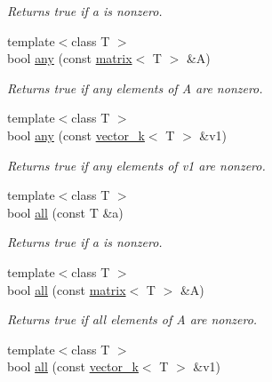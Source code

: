 \begin{DoxyCompactItemize}
\begin{DoxyCompactList}\small\item\em Returns true if a is nonzero. \end{DoxyCompactList}\item 
\hypertarget{namespacekeycpp_ade6d308fd22d34ad4860e5fcd22ccb39}{{\footnotesize template$<$class T $>$ }\\bool \hyperlink{namespacekeycpp_ade6d308fd22d34ad4860e5fcd22ccb39}{any} (const \hyperlink{classkeycpp_1_1matrix}{matrix}$<$ T $>$ \&A)}\label{namespacekeycpp_ade6d308fd22d34ad4860e5fcd22ccb39}

\begin{DoxyCompactList}\small\item\em Returns true if any elements of A are nonzero. \end{DoxyCompactList}\item 
\hypertarget{namespacekeycpp_af40fa7667b60f30a3b0912464d382d57}{{\footnotesize template$<$class T $>$ }\\bool \hyperlink{namespacekeycpp_af40fa7667b60f30a3b0912464d382d57}{any} (const \hyperlink{classkeycpp_1_1vector__k}{vector\-\_\-k}$<$ T $>$ \&v1)}\label{namespacekeycpp_af40fa7667b60f30a3b0912464d382d57}

\begin{DoxyCompactList}\small\item\em Returns true if any elements of v1 are nonzero. \end{DoxyCompactList}\item 
\hypertarget{namespacekeycpp_aab77d82d9cc7d1fcca87967048f09e0e}{{\footnotesize template$<$class T $>$ }\\bool \hyperlink{namespacekeycpp_aab77d82d9cc7d1fcca87967048f09e0e}{all} (const T \&a)}\label{namespacekeycpp_aab77d82d9cc7d1fcca87967048f09e0e}

\begin{DoxyCompactList}\small\item\em Returns true if a is nonzero. \end{DoxyCompactList}\item 
\hypertarget{namespacekeycpp_a0ebd51ca90981278382a922c04ee7a75}{{\footnotesize template$<$class T $>$ }\\bool \hyperlink{namespacekeycpp_a0ebd51ca90981278382a922c04ee7a75}{all} (const \hyperlink{classkeycpp_1_1matrix}{matrix}$<$ T $>$ \&A)}\label{namespacekeycpp_a0ebd51ca90981278382a922c04ee7a75}

\begin{DoxyCompactList}\small\item\em Returns true if all elements of A are nonzero. \end{DoxyCompactList}\item 
\hypertarget{namespacekeycpp_a9fe10fe179c6988a6f72e3715197457c}{{\footnotesize template$<$class T $>$ }\\bool \hyperlink{namespacekeycpp_a9fe10fe179c6988a6f72e3715197457c}{all} (const \hyperlink{classkeycpp_1_1vector__k}{vector\-\_\-k}$<$ T $>$ \&v1)}\label{namespacekeycpp_a9fe10fe179c6988a6f72e3715197457c}


\end{DoxyCompactItemize}
